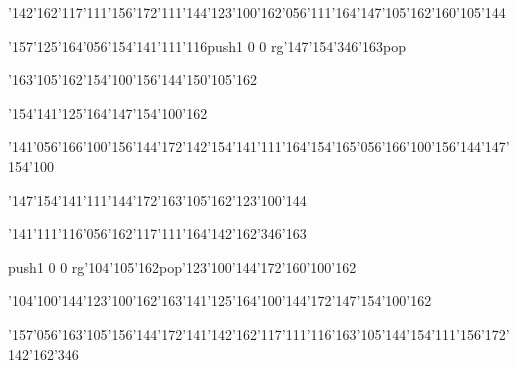 \null\vfill\ipa\centerline{\enskip\char'142\char'162\char'117\char'111\char'156\char'172\enskip\char'111\char'144\enskip\char'123\char'100\char'162\char'056\char'111\char'164\enskip\enskip\enskip\char'147\char'105\char'162\enskip\char'160\char'105\char'144}\medskip\centerline{\enskip\char'157\char'125\char'164\char'056\char'154\char'141\char'111\char'116\enskip\enskip\enskip\enskip\enskip\enskip\enskip\enskip\enskip\enskip\enskip\pdfcolorstack\match push{1 0 0 rg}\char'147\char'154\char'346\char'163\pdfcolorstack\match pop{}}\medskip\centerline{\enskip\char'163\char'105\char'162\enskip\enskip\enskip\enskip\char'154\char'100\char'156\char'144\enskip\enskip\enskip\char'150\char'105\char'162}\medskip\centerline{\enskip\enskip\enskip\enskip\enskip\enskip\enskip\enskip\enskip\enskip\enskip\enskip\char'154\char'141\char'125\char'164\enskip\enskip\enskip\enskip\enskip\char'147\char'154\char'100\char'162}\medskip\centerline{\enskip\char'141\char'056\char'166\char'100\char'156\char'144\char'172\enskip\enskip\enskip\char'142\char'154\char'141\char'111\char'164\enskip\enskip\enskip\enskip\char'154\char'165\char'056\char'166\char'100\char'156\char'144\enskip\char'147\char'154\char'100}\medskip\vfill\footline{\hfil\tt\folio\hfil}\eject
\null\vfill\ipa\centerline{\enskip\char'147\char'154\char'141\char'111\char'144\char'172\enskip\enskip\enskip\enskip\enskip\enskip\enskip\enskip\enskip\enskip\enskip\enskip\char'163\char'105\char'162\enskip\char'123\char'100\char'144}\medskip\centerline{\enskip\char'141\char'111\char'116\char'056\char'162\char'117\char'111\char'164\enskip\enskip\enskip\enskip\enskip\enskip\enskip\enskip\enskip\enskip\enskip\char'142\char'162\char'346\char'163}\medskip\centerline{\enskip\pdfcolorstack\match push{1 0 0 rg}\char'104\char'105\char'162\pdfcolorstack\match pop{}\enskip\enskip\enskip\enskip\char'123\char'100\char'144\char'172\enskip\enskip\enskip\char'160\char'100\char'162}\medskip\centerline{\enskip\enskip\enskip\enskip\char'104\char'100\char'144\enskip\char'123\char'100\char'162\enskip\char'163\char'141\char'125\char'164\enskip\char'100\char'144\char'172\enskip\char'147\char'154\char'100\char'162}\medskip\centerline{\enskip\char'157\char'056\char'163\char'105\char'156\char'144\char'172\enskip\char'141\enskip\char'142\char'162\char'117\char'111\char'116\enskip\char'163\char'105\char'144\enskip\enskip\enskip\char'154\char'111\char'156\char'172\enskip\char'142\char'162\char'346}\medskip\vfill\footline{\hfil\tt\folio\hfil}\eject
